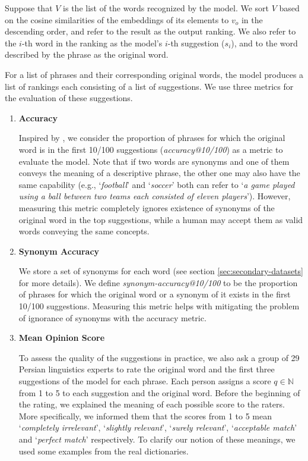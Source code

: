 \documentclass{article}
\begin{document}
Suppose that $V$ is the list of the words recognized by the model. We sort $V$ based on the cosine similarities of the embeddings of its elements to $v_o$ in the descending order, and refer to the result as the output ranking. We also refer to the $i$-th word in the ranking as the model's $i$-th suggestion ($s_i$), and to the word described by the phrase as the original word.

For a list of phrases and their corresponding original words, the model produces a list of rankings each consisting of a list of suggestions. We use three metrics for the evaluation of these suggestions.
\begin{enumerate}
	\item \textbf{Accuracy} 
	
	Inspired by \citet{hill2016learning}, we consider the proportion of phrases for which the original word is in the first 10/100 suggestions (\textit{accuracy@10/100}) as a metric to evaluate the model. Note that if two words are synonyms and one of them conveys the meaning of a descriptive phrase, the other one may also have the same capability (e.g., `\textit{football}' and `\textit{soccer}' both can refer to `\textit{a game played using a ball between two teams each consisted of eleven players}').
	However, measuring this metric completely ignores existence of synonyms of the original word in the top suggestions, while a human may accept them as valid words conveying the same concepts.
	
	\item \textbf{Synonym Accuracy}
	
	We store a set of synonyms for each word (see section \ref{sec:secondary-datasets} for more details).
	We define \textit{synonym-accuracy@10/100} to be the proportion of phrases for which the original word or a synonym of it exists in the first 10/100 suggestions. Measuring this metric helps with mitigating the problem of ignorance of synonyms with the accuracy metric.
	
	\item \textbf{Mean Opinion Score \label{item:mos}}
	
	To assess the quality of the suggestions in practice, we also ask a group of 29 Persian linguistics experts to rate the original word and the first three suggestions of the model for each phrase. Each person assigns a score $q\in\mathbb{N}$ from 1 to 5 to each suggestion and the original word. Before the beginning of the rating, we explained the meaning of each possible score to the raters. More specifically, we informed them that the scores from 1 to 5 mean `\textit{completely irrelevant}', `\textit{slightly relevant}', `\textit{surely relevant}', `\textit{acceptable match}' and `\textit{perfect match}' respectively. To clarify our notion of these meanings, we used some examples from the real dictionaries.   
	

\end{enumerate}
\end{document}
